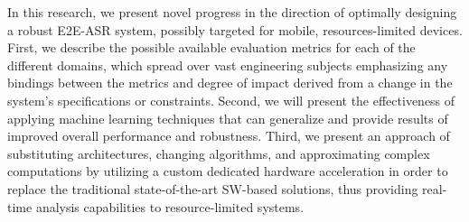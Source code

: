 In this research, we present novel progress
in the direction of optimally designing a
robust E2E-ASR system, possibly targeted for
mobile, resources-limited devices.
First, we describe the possible 
available evaluation metrics
for each of the different domains, which spread
over vast engineering subjects
emphasizing any bindings between 
the metrics and degree of impact
derived from a change in 
the system's specifications
or constraints.
Second, we will present the effectiveness
of applying machine learning techniques 
that can generalize and provide results 
of improved overall performance and robustness.
Third, we present an approach of substituting
architectures, changing algorithms,
and approximating complex computations
by utilizing 
a custom dedicated hardware acceleration 
in order to replace the 
traditional state-of-the-art SW-based 
solutions, thus providing real-time 
analysis capabilities to resource-limited systems.

